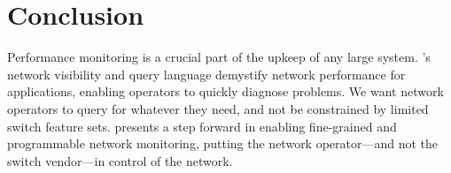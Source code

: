 \section{Conclusion}
\label{sec:conclusion}

Performance monitoring is a crucial part of the upkeep of any large system.
\TheSystem's network visibility and query language demystify network
performance for applications, enabling operators to quickly diagnose
problems.  We want network operators to query for whatever they need, and not
be constrained by limited switch feature sets. \TheSystem presents a step
forward in enabling fine-grained and programmable network monitoring, putting
the network operator---and not the switch vendor---in control of the network.
